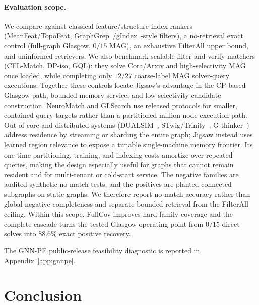 \documentclass{article}
\begin{document}
\paragraph{Evaluation scope.} We compare against classical feature/structure-index rankers (MeanFeat/TopoFeat, GraphGrep~\cite{ref_graphgrep}/gIndex~\cite{ref_gindex}-style filters), a no-retrieval exact control (full-graph Glasgow, $0/15$ MAG), an exhaustive FilterAll upper bound, and uninformed retrievers. We also benchmark scalable filter-and-verify matchers (CFL-Match, DP-iso, GQL): they solve Cora/Arxiv and high-selectivity MAG once loaded, while completing only $12/27$ coarse-label MAG solver-query executions. Together these controls locate Jigsaw's advantage in the CP-based Glasgow path, bounded-memory service, and low-selectivity candidate construction. NeuroMatch and GLSearch use released protocols for smaller, contained-query targets rather than a partitioned million-node execution path. Out-of-core and distributed systems (DUALSIM~\cite{ref_dualsim}, STwig/Trinity~\cite{ref_trinity}, G-thinker~\cite{ref_gthinker}) address residence by streaming or sharding the entire graph; Jigsaw instead uses learned region relevance to expose a tunable single-machine memory frontier. Its one-time partitioning, training, and indexing costs amortize over repeated queries, making the design especially useful for graphs that cannot remain resident and for multi-tenant or cold-start service. The negative families are audited synthetic no-match tests, and the positives are planted connected subgraphs on static graphs. We therefore report no-match accuracy rather than global negative completeness and separate bounded retrieval from the FilterAll ceiling. Within this scope, FullCov improves hard-family coverage and the complete cascade turns the tested Glasgow operating point from $0/15$ direct solves into $88.6\%$ exact positive recovery.

The GNN-PE public-release feasibility diagnostic is reported in Appendix~\ref{app:gnnpe}.

\section{Conclusion}
\end{document}

